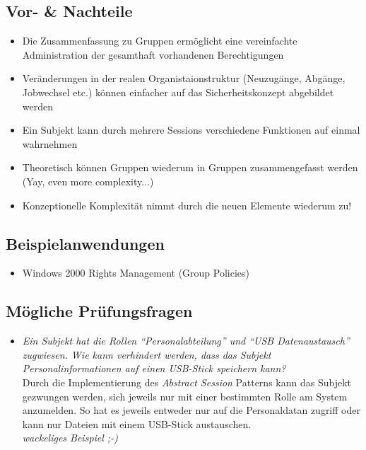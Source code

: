 \subsection*{Vor- \& Nachteile}
\begin{itemize}
	\item Die Zusammenfassung zu Gruppen ermöglicht eine vereinfachte Administration der gesamthaft vorhandenen Berechtigungen
	\item Veränderungen in der realen Organistaionstruktur (Neuzugänge, Abgänge, Jobwechsel etc.) können einfacher auf das Sicherheitskonzept abgebildet werden
	\item Ein Subjekt kann durch mehrere Sessions verschiedene Funktionen auf einmal wahrnehmen
	\item Theoretisch können Gruppen wiederum in Gruppen zusammengefasst werden (Yay, even more complexity...)
	\item Konzeptionelle Komplexität nimmt durch die neuen Elemente wiederum zu!
\end{itemize}

\subsection*{Beispielanwendungen}
\begin{itemize}
	\item Windows 2000 Rights Management (Group Policies)
\end{itemize}


\subsection*{Mögliche Prüfungsfragen}
\begin{itemize}
	\item \emph{Ein Subjekt hat die Rollen ``Personalabteilung'' und ``USB Datenaustausch'' zugwiesen. Wie kann verhindert werden, dass das Subjekt Personalinformationen auf einen USB-Stick speichern kann?}\\
	Durch die Implementierung des \emph{Abstract Session} Patterns kann das Subjekt gezwungen werden, sich jeweils nur mit einer bestimmten Rolle am System anzumelden. So hat es jeweils entweder nur auf die Personaldatan zugriff oder kann nur Dateien mit einem USB-Stick austauschen.\\
	\emph{wackeliges Beispiel ;-)}
\end{itemize}